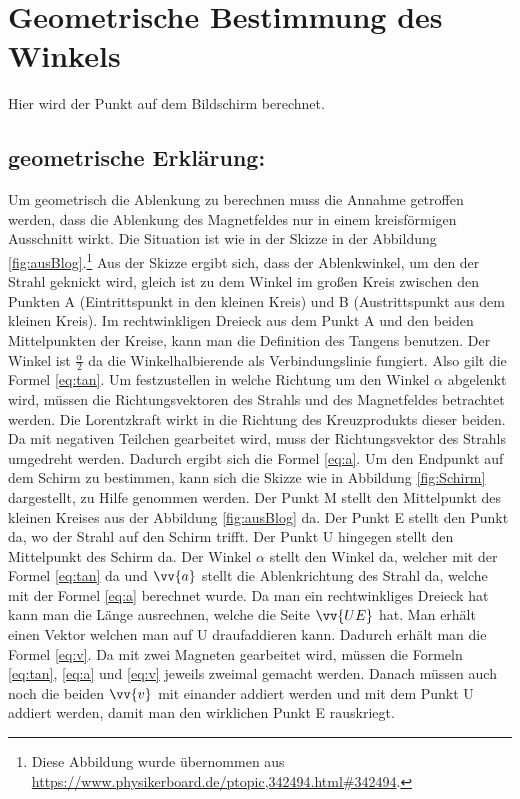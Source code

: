 \section{Geometrische Bestimmung des Winkels}

Hier wird der Punkt auf dem Bildschirm berechnet.
\subsection{geometrische Erklärung:}
Um geometrisch die Ablenkung zu berechnen muss die Annahme getroffen werden, dass die Ablenkung des Magnetfeldes nur in einem kreisförmigen Ausschnitt wirkt. Die Situation ist wie in der Skizze in der Abbildung \ref{fig:ausBlog}.\footnote{Diese Abbildung wurde übernommen aus \url{https://www.physikerboard.de/ptopic,342494.html#342494}.} Aus der Skizze ergibt sich, dass der Ablenkwinkel, um den der Strahl geknickt wird, gleich ist zu dem Winkel im großen Kreis zwischen den Punkten A (Eintrittspunkt in den kleinen Kreis) und B (Austrittspunkt aus dem kleinen Kreis). Im rechtwinkligen Dreieck aus dem Punkt A und den beiden Mittelpunkten der Kreise, kann man die Definition des Tangens benutzen. Der Winkel ist $\frac{\alpha}{2}$ da die Winkelhalbierende als Verbindungslinie fungiert. Also gilt die Formel \ref{eq:tan}. Um festzustellen in welche Richtung um den Winkel $\alpha$ abgelenkt wird, müssen die Richtungsvektoren des Strahls und des Magnetfeldes betrachtet werden. Die Lorentzkraft wirkt in die Richtung des Kreuzprodukts dieser beiden. Da mit negativen Teilchen gearbeitet wird, muss der Richtungsvektor des Strahls umgedreht werden. Dadurch ergibt sich die Formel \ref{eq:a}. Um den Endpunkt auf dem Schirm zu bestimmen, kann sich die Skizze wie in Abbildung \ref{fig:Schirm} dargestellt, zu Hilfe genommen werden. Der Punkt M stellt den Mittelpunkt des kleinen Kreises aus der Abbildung \ref{fig:ausBlog} da. Der Punkt E stellt den Punkt da, wo der Strahl auf den Schirm trifft. Der Punkt U hingegen stellt den Mittelpunkt des Schirm da. Der Winkel $\alpha$ stellt den Winkel da, welcher mit der Formel \ref{eq:tan} da und $\vv{a}$ stellt die Ablenkrichtung des Strahl da, welche mit der Formel \ref{eq:a} berechnet wurde. Da man ein rechtwinkliges Dreieck hat kann man die Länge ausrechnen, welche die Seite $\vv{UE}$ hat. Man erhält einen Vektor welchen man auf U draufaddieren kann. Dadurch erhält man die Formel \ref{eq:v}. Da mit zwei Magneten gearbeitet wird, müssen die Formeln \ref{eq:tan}, \ref{eq:a} und \ref{eq:v} jeweils zweimal gemacht werden. Danach müssen auch noch die beiden $\vv{v}$ mit einander addiert werden und mit dem Punkt U addiert werden, damit man den wirklichen Punkt E rauskriegt.
